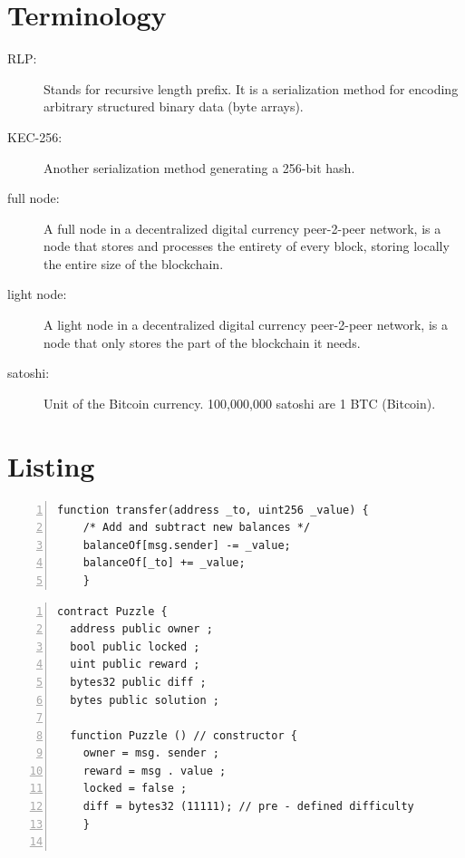 \documentclass[USenglish]{uit-thesis}
\begin{document}
\begin{appendices}
	\chapter{Terminology}
	\label{app:terminology}
	\begin{description}
		\item[RLP:] Stands for recursive length prefix. It is a serialization method
		for encoding arbitrary structured binary data (byte arrays).
		\label{item:rlp}
		\item[KEC-256:] Another serialization method generating a 256-bit hash.
		\item[full node:] A full node in a decentralized digital currency peer-2-peer network, is a node that stores
		and processes the entirety of every block, storing locally the entire size of the blockchain.
		\item[light node:] A light node in a decentralized digital currency peer-2-peer network, is a node that only
		stores the part of the blockchain it needs.
		\item[satoshi:] Unit of the Bitcoin currency. 100,000,000 satoshi are 1 BTC (Bitcoin).
	\end{description}
	\chapter{Listing}
	\label{app:listing}
	\begin{lstlisting}[numbers=left,frame=single,caption={Smart contract transaction code in Ethereum.}]
function transfer(address _to, uint256 _value) {
	/* Add and subtract new balances */
	balanceOf[msg.sender] -= _value;
	balanceOf[_to] += _value;
	}
	\end{lstlisting}
	
\begin{lstlisting}[float, numbers=left,frame=single,caption={Example of a smart contract that rewards users who solve a computational puzzle~\cite{smartcontracts}.}]
contract Puzzle {
  address public owner ;
  bool public locked ;
  uint public reward ;
  bytes32 public diff ;
  bytes public solution ;

  function Puzzle () // constructor {
    owner = msg. sender ;
    reward = msg . value ;
    locked = false ;
    diff = bytes32 (11111); // pre - defined difficulty
    }


\end{lstlisting}
\end{appendices}
\end{document}
